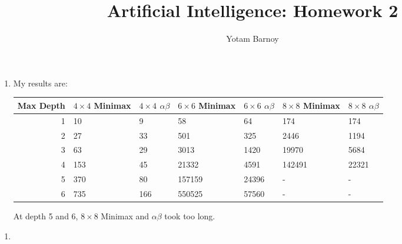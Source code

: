 \documentclass[12pt]{article}
\title{Artificial Intelligence: Homework 2}
\author{Yotam Barnoy}
\date{}
\begin{document}
\large
\maketitle
\thispagestyle{headings}

\vspace{-.5in}

\begin{enumerate}
	\item My results are:

		\begin{table}[h]
		\centering
		\begin{tabular}{|r|l|l|l|l|l|l|}
			\hline
			Max Depth & \( 4 \times 4 \) Minimax & \( 4 \times 4 \) \( \alpha \beta \) & \( 6 \times 6 \) Minimax & \( 6 \times 6 \) \( \alpha \beta \) & \( 8 \times 8 \) Minimax & \( 8 \times 8 \) \( \alpha \beta \) \\ \hline
			1 &  10  & 9   &     58 &    64 &     174 &   174 \\ \hline
			2 &  27  & 33  &    501 &   325 &    2446 &  1194 \\ \hline
			3 &  63  & 29  &   3013 &  1420 &   19970 &  5684 \\ \hline
			4 &  153 & 45  &  21332 &  4591 &  142491 & 22321 \\ \hline
			5 &  370 & 80  & 157159 & 24396 &   -     &   -   \\ \hline
			6 &  735 & 166 & 550525 & 57560 &	 	-     &   -   \\ \hline
		\end{tabular}
		\end{table}

	At depth 5 and 6, $8\times8$ Minimax and $\alpha\beta$ took too long.

\end{enumerate}

\begin{enumerate}
  \setcounter{11}
	\item 

\end{enumerate}
\end{document}
